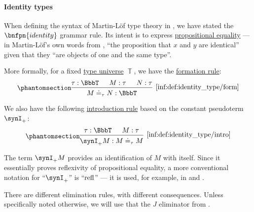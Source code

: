 \paragraph{Identity types}

\begin{definition}\label{def:identity_type}
  When defining the syntax of Martin-L\"of type theory in , we have stated the \( \bnfpn{identity} \) grammar rule. Its intent is to express \hyperref[con:equality]{propositional equality} --- in Martin-L\"of's own words from \cite[81]{MartinLöf1975IntuitionisticTypeTheory}, \enquote{the proposition that \( x \) and \( y \) are identical} given that they \enquote{are objects of one and the same type}.

  More formally, for a fixed \hyperref[con:type_universe]{type universe} \( \BbbT \), we have the \hyperref[rem:type_theory_rule_classification/form]{formation rule}:
  \begin{equation*}\taglabel[\ensuremath{ =_{\logic{form}} }]{inf:def:identity_type/form}
    \begin{prooftree}
      \hypo{ \tau: \BbbT }
      \hypo{ M: \tau }
      \hypo{ N: \tau }
      \infer3[\ref{inf:def:identity_type/form}]{ M \syneq_{\tau} N: \BbbT }
    \end{prooftree}
  \end{equation*}

  We also have the following \hyperref[rem:type_theory_rule_classification/intro]{introduction rule} based on the constant pseudoterm \( \synI_+ \):
  \begin{equation*}\taglabel[\ensuremath{ =_+ }]{inf:def:identity_type/intro}
    \begin{prooftree}
      \hypo{ \tau: \BbbT }
      \hypo{ M: \tau }
      \infer2[\ref{inf:def:identity_type/intro}]{ \synI_+ M: M \syneq_\tau M }
    \end{prooftree}
  \end{equation*}

  The term \( \synI_+ M \) provides an identification of \( M \) with itself. Since it essentially proves reflexivity of propositional equality, a more conventional notation for \enquote{\( \synI_+ \)} is \enquote{\( \op{refl} \)} --- it is used, for example, in \cite[\S A.2.10]{UnivalentFoundationsProgram2024OctoberHoTT} and \cite[\S 9.1.3]{Mimram2020ProgramEqualsProof}.

  There are different elimination rules, with different consequences. Unless specifically noted otherwise, we will use that the \( J \) eliminator from .


\end{definition}
